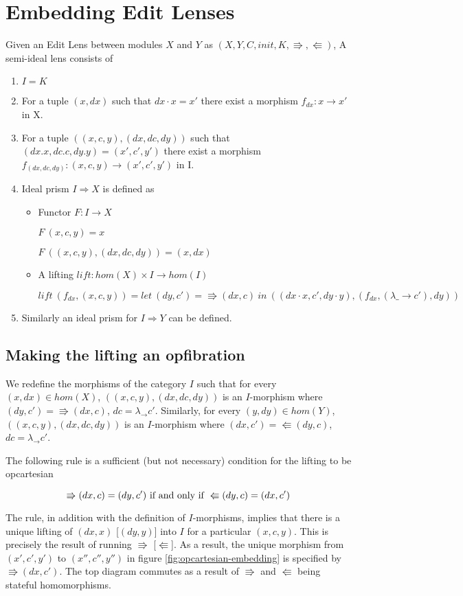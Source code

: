 \documentclass[a4paper,10pt]{article}
\begin{document}
\section{Embedding Edit Lenses}
Given an Edit Lens between modules $X$ and $Y$ as $(X,Y,C,init,K,\Rrightarrow,\Lleftarrow)$, A semi-ideal lens consists of
\begin{enumerate}
\item $I = K$
\item For a tuple $(x,dx)$ such that $dx \cdot x=x'$ there
  exist a morphism $f_{dx}: x \to x'$ in X. 
\item For a tuple $((x,c,y),(dx,dc,dy))$ such
  that $(dx.x,dc.c,dy.y)=(x',c',y')$ there exist a morphism $f_{(dx,dc,dy)}:
  (x,c,y) \to (x',c',y')$ in I.
\item Ideal prism $I \Rightarrow X$ is defined as 

\begin {itemize}
\item Functor $F: I \to X$ 

$F~(x,c,y) = x$ 

$F~((x,c,y),(dx,dc,dy))=(x,dx)$ 
\item A lifting $lift: hom(X) \times I \to hom(I)$ 
      
$lift~(f_{dx},(x,c,y))=let~(dy,c')=\Rrightarrow(dx,c)~in~((dx \cdot x, c', dy \cdot y), (f_{dx},(\lambda
  \_ \to c'),dy))$
\end{itemize}
\item Similarly an ideal prism for $I \Rightarrow Y$ can be defined.
\end{enumerate}

\subsection{Making the lifting an opfibration}
  We redefine the morphisms of the category $I$ such that for every $(x, dx) \in hom(X)$, $((x,c,y),(dx,dc,dy))$ is an $I$-morphism where $(dy,c') = \Rrightarrow (dx,c)$, $dc = \lambda _ \to c'$.
  Similarly, for every $(y, dy) \in hom(Y)$, $((x,c,y),(dx,dc,dy))$ is an $I$-morphism where $(dx,c') = \Lleftarrow (dy,c)$, $dc = \lambda _ \to c'$. 
  
  The following rule is a sufficient (but not necessary) condition for the lifting to be opcartesian
  
  \[ \Rrightarrow (dx,c) = (dy, c') \textnormal{ if and only if } \Lleftarrow (dy, c) = (dx, c') \]

  The rule, in addition with the definition of $I$-morphisms, implies that there is a unique lifting of $(dx, x)$ [$(dy, y)$] into $I$ for a particular $(x,c,y)$. This is precisely the result of running $\Rrightarrow$ [$\Lleftarrow$]. As a result, the unique morphism from $(x',c',y')$ to $(x'',c'',y'')$ in figure \ref{fig:opcartesian-embedding} is specified by $\Rrightarrow (dx, c')$. The top diagram commutes as a result of $\Rrightarrow$ and $\Lleftarrow$ being stateful homomorphisms.
  
\end{document}
